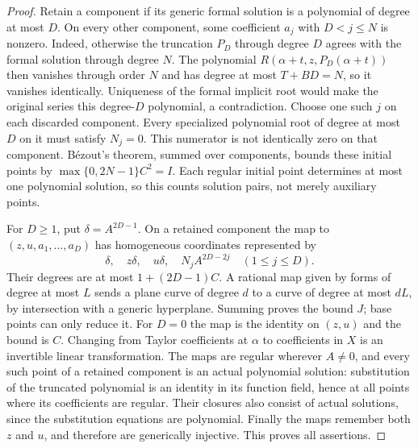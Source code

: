 \begin{proof}
Retain a component if its generic formal solution is a polynomial of
degree at most $D$. On every other component, some coefficient $a_j$
with $D<j\le N$ is nonzero. Indeed, otherwise the truncation $P_D$
through degree $D$ agrees with the formal solution through degree $N$.
The polynomial $R(\alpha+t,z,P_D(\alpha+t))$ then vanishes through
order $N$ and has degree at most $T+BD=N$, so it vanishes identically.
Uniqueness of the formal implicit root would make the original series
this degree-$D$ polynomial, a contradiction.
Choose one such $j$ on each discarded component. Every specialized
polynomial root of degree at most $D$ on it must satisfy $N_j=0$.
This numerator is not identically zero on that component.
B\'ezout's theorem, summed over components, bounds these initial
points by $\max\{0,2N-1\}C^2=I$.
Each regular initial point determines at most one polynomial solution,
so this counts solution pairs, not merely auxiliary points.

For $D\ge1$, put $\delta=A^{2D-1}$. On a retained component the map
to $(z,u,a_1,\ldots,a_D)$ has homogeneous coordinates represented by
\[
 \delta,\quad z\delta,\quad u\delta,\quad
 N_jA^{2D-2j}\quad(1\le j\le D).
\]
Their degrees are at most $1+(2D-1)C$. A rational map given by forms
of degree at most $L$ sends a plane curve of degree $d$ to a curve of
degree at most $dL$, by intersection with a generic hyperplane.
Summing proves the bound $J$; base points can only reduce it.
For $D=0$ the map is the identity on $(z,u)$ and the bound is $C$.
Changing from Taylor coefficients at $\alpha$ to coefficients in $X$
is an invertible linear transformation.
The maps are regular wherever $A\ne0$, and every such point of a
retained component is an actual polynomial solution: substitution of
the truncated polynomial is an identity in its function field, hence
at all points where its coefficients are regular. Their closures also
consist of actual solutions, since the substitution equations are
polynomial. Finally the maps remember both $z$ and $u$, and therefore
are generically injective. This proves all assertions.
\end{proof}
